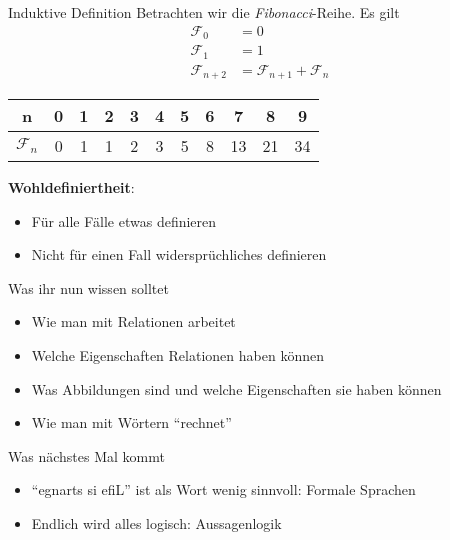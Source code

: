 \begin{frame}{Induktive Definition}
	Betrachten wir die \emph{Fibonacci}-Reihe.
	Es gilt 
	\begin{align*}
		\mathcal{F}_{0} &= 0 \\
		\mathcal{F}_1 &= 1 \\
		\mathcal{F}_{n+2} &= \mathcal{F}_{n+1} + \mathcal{F}_n 		
	\end{align*}
	\pause
	\begin{table}
		\centering
		\begin{tabular}{|c|c|c|c|c|c|c|c|c|c|c|}
		\hline
		n & 0 & 1 & 2 & 3 & 4 & 5 & 6 & 7 & 8 & 9 \\ \hline
		$\mathcal{F}_n$ & 0 & 1 & 1 & 2 & 3 & 5 & 8 & 13 & 21 & 34 \\ \hline
		\end{tabular}
	\end{table}

	\pause
	\textbf{Wohldefiniertheit}: 
	\begin{itemize}
		\item Für alle Fälle etwas definieren 
		\item Nicht für einen Fall widersprüchliches definieren
	\end{itemize}
\end{frame}





\begin{frame}	
	\begin{block}{Was ihr nun wissen solltet}
		\begin{itemize}
			\item Wie man mit Relationen arbeitet
			\item Welche Eigenschaften Relationen haben können
			\item Was Abbildungen sind und welche Eigenschaften sie haben können
			\item Wie man mit Wörtern \enquote{rechnet}
		\end{itemize}
	\end{block}
	
	\begin{block}{Was nächstes Mal kommt}
		\begin{itemize}
			\item \enquote{egnarts si efiL} ist als Wort wenig sinnvoll: Formale Sprachen
			\item Endlich wird alles logisch: Aussagenlogik
		\end{itemize}
	\end{block}
\end{frame}


\slideThanks


